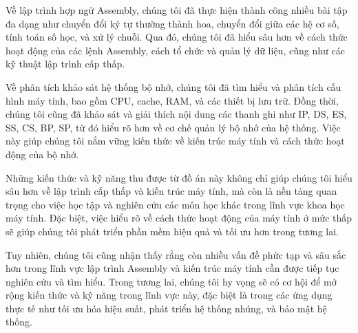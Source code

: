 \documentclass[12pt,a4paper,openany,oneside]{report}
\begin{document}
Về lập trình hợp ngữ Assembly, chúng tôi đã thực hiện thành công nhiều bài tập đa dạng như chuyển đổi ký tự thường thành hoa, chuyển đổi giữa các hệ cơ số, tính toán số học, và xử lý chuỗi. Qua đó, chúng tôi đã hiểu sâu hơn về cách thức hoạt động của các lệnh Assembly, cách tổ chức và quản lý dữ liệu, cũng như các kỹ thuật lập trình cấp thấp.

Về phân tích khảo sát hệ thống bộ nhớ, chúng tôi đã tìm hiểu và phân tích cấu hình máy tính, bao gồm CPU, cache, RAM, và các thiết bị lưu trữ. Đồng thời, chúng tôi cũng đã khảo sát và giải thích nội dung các thanh ghi như IP, DS, ES, SS, CS, BP, SP, từ đó hiểu rõ hơn về cơ chế quản lý bộ nhớ của hệ thống. Việc này giúp chúng tôi nắm vững kiến thức về kiến trúc máy tính và cách thức hoạt động của bộ nhớ.

Những kiến thức và kỹ năng thu được từ đồ án này không chỉ giúp chúng tôi hiểu sâu hơn về lập trình cấp thấp và kiến trúc máy tính, mà còn là nền tảng quan trọng cho việc học tập và nghiên cứu các môn học khác trong lĩnh vực khoa học máy tính. Đặc biệt, việc hiểu rõ về cách thức hoạt động của máy tính ở mức thấp sẽ giúp chúng tôi phát triển phần mềm hiệu quả và tối ưu hơn trong tương lai.

Tuy nhiên, chúng tôi cũng nhận thấy rằng còn nhiều vấn đề phức tạp và sâu sắc hơn trong lĩnh vực lập trình Assembly và kiến trúc máy tính cần được tiếp tục nghiên cứu và tìm hiểu. Trong tương lai, chúng tôi hy vọng sẽ có cơ hội để mở rộng kiến thức và kỹ năng trong lĩnh vực này, đặc biệt là trong các ứng dụng thực tế như tối ưu hóa hiệu suất, phát triển hệ thống nhúng, và bảo mật hệ thống.
\end{document}
